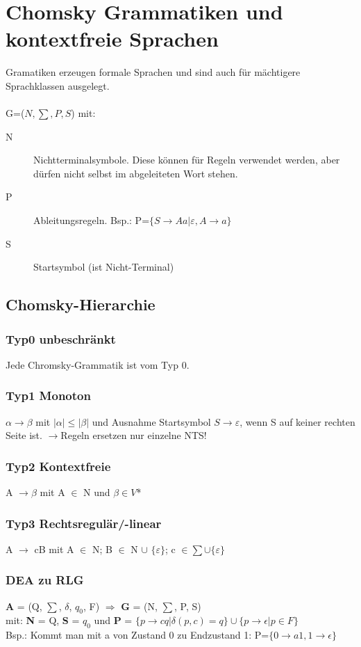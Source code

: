 \documentclass[12pt,a4paper]{article}
\begin{document}
\section{Chomsky Grammatiken und kontextfreie Sprachen}
	Gramatiken erzeugen formale Sprachen und sind auch für mächtigere Sprachklassen ausgelegt.\\\\
	G=($N, \sum , P, S$) mit:
	\begin{description}
		\item[N] Nichtterminalsymbole. Diese können für Regeln verwendet werden, aber dürfen nicht selbst im abgeleiteten Wort stehen.
		\item[P] Ableitungsregeln. Bsp.: P=$\{ S \rightarrow Aa | \varepsilon , A \rightarrow a \} $ 
		\item[S] Startsymbol (ist Nicht-Terminal)
	\end{description}

	\subsection{Chomsky-Hierarchie}
	\subsubsection{Typ0 unbeschränkt}
	Jede Chromsky-Grammatik ist vom Typ 0.

    \subsubsection{Typ1 Monoton}
    $\alpha \rightarrow \beta$ mit $| \alpha | \leq  | \beta |$ und Ausnahme Startsymbol $S \rightarrow \varepsilon$, wenn S auf keiner rechten Seite ist. \newline
	$\rightarrow$Regeln ersetzen nur einzelne NTS!

    \subsubsection{Typ2 Kontextfreie}
	A $\rightarrow \beta$ mit A $\in$ N und $\beta \in V$* 

    \subsubsection{Typ3 Rechtsregulär/-linear}
	A $\rightarrow$ cB mit A $\in$ N; B $\in$ N $\cup$ $\{ \varepsilon \}$; c $\in \sum \cup \{ \varepsilon \}$

	\subsubsection{DEA zu RLG}
	\textbf{A} = (Q, $\sum$, $\delta$, $q_0$, F) $\Rightarrow$ \textbf{G} = (N, $\sum$, P, S)\\
	mit: \textbf{N} = Q, \textbf{S} = $q_0$ und \textbf{P} = $\{p \rightarrow cq | \delta (p, c) = q\} \cup \{p \rightarrow \epsilon | p \in F\}$ \\
	Bsp.: Kommt man mit a von Zustand 0 zu Endzustand 1: P=$\{ 0 \rightarrow a1, 1 \rightarrow \epsilon \}$
\end{document}
